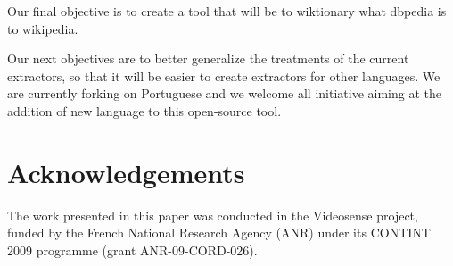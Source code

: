 \documentclass[10pt, a4paper]{article}
\begin{document}
Our final objective is to create a tool that will be to wiktionary what dbpedia \cite{Auer07dbpedia:a} is to wikipedia. 

Our next objectives are to better generalize the treatments of the current extractors, so that it will be easier to create extractors for other languages. We are currently forking on Portuguese and we welcome all initiative aiming at the addition of new language to this open-source tool.

\section{Acknowledgements}

The work presented in this paper was conducted in the Videosense project, funded by the French National Research Agency (ANR) under its CONTINT 2009 programme (grant ANR-09-CORD-026).


\end{document}
